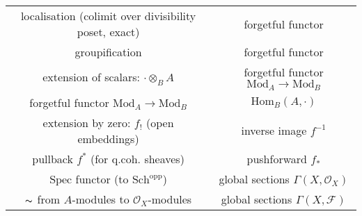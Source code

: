 \documentclass[12pt]{article}
\newcommand{\scr}[1]{\mathcal{#1}}
\newcommand{\Hom}{\mathrm{Hom}}
\newcommand{\spec}{\mathrm{Spec}}
\newcommand{\shf}{\mathscr{F}}
\begin{document}
\begin{center}
\begin{tabular}{|c| c|}
localisation (colimit over divisibility poset, exact) &  forgetful functor  \\
groupification & forgetful functor \\
extension of scalars: $\cdot \otimes_{B} A$ & forgetful functor $\mathrm{Mod}_{A} \to \mathrm{Mod}_{B}$ \\
forgetful functor $\mathrm{Mod}_{A} \to \mathrm{Mod}_{B}$ &  $\Hom_{B}(A, \cdot)$ \\
extension by zero: $f_{!}$ (open embeddings)  & inverse image $f^{-1}$ \\
pullback $f^{*}$ (for q.coh. sheaves) & pushforward $f_{*}$ \\
$\spec$ functor (to $\mathrm{Sch}^{\text{opp}}$) & global sections $\Gamma(X, \scr{O}_X)$ \\
$\thicksim$ from $A$-modules to $\scr{O}_X$-modules & global sections $\Gamma(X, \shf)$ \\
\hline
\end{tabular}
\end{center}
\end{document}
